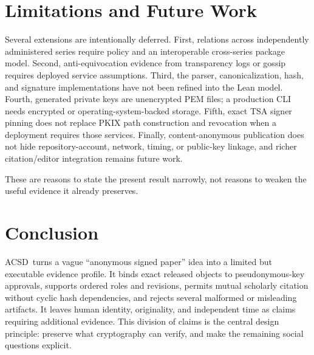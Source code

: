 \documentclass[11pt]{article}
\newcommand{\acsd}{\textsc{ACSD}}
\begin{document}
\section{Limitations and Future Work}

Several extensions are intentionally deferred. First, relations across independently administered series require policy and an interoperable cross-series package model. Second, anti-equivocation evidence from transparency logs or gossip requires deployed service assumptions. Third, the parser, canonicalization, hash, and signature implementations have not been refined into the Lean model. Fourth, generated private keys are unencrypted PEM files; a production CLI needs encrypted or operating-system-backed storage. Fifth, exact TSA signer pinning does not replace PKIX path construction and revocation when a deployment requires those services. Finally, content-anonymous publication does not hide repository-account, network, timing, or public-key linkage, and richer citation/editor integration remains future work.

These are reasons to state the present result narrowly, not reasons to weaken the useful evidence it already preserves.

\section{Conclusion}

\acsd\ turns a vague ``anonymous signed paper'' idea into a limited but executable evidence profile. It binds exact released objects to pseudonymous-key approvals, supports ordered roles and revisions, permits mutual scholarly citation without cyclic hash dependencies, and rejects several malformed or misleading artifacts. It leaves human identity, originality, and independent time as claims requiring additional evidence. This division of claims is the central design principle: preserve what cryptography can verify, and make the remaining social questions explicit.
\end{document}
